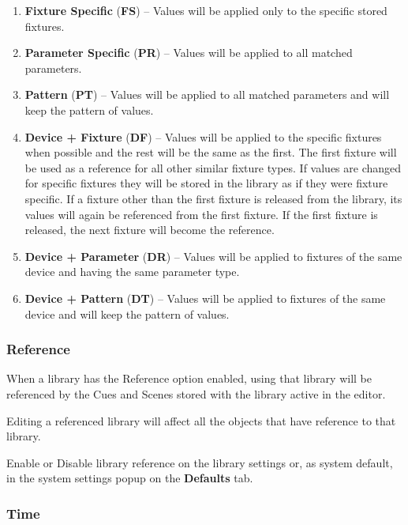 \documentclass[
]{article}
\begin{document}
\begin{enumerate}
\def\labelenumi{\arabic{enumi}.}
\item
  \textbf{Fixture Specific} (\textbf{FS}) -- Values will be applied only to the specific stored fixtures.
\item
  \textbf{Parameter Specific} (\textbf{PR}) -- Values will be applied to all matched parameters.
\item
  \textbf{Pattern} (\textbf{PT}) -- Values will be applied to all matched parameters and will keep the pattern of values.
\item
  \textbf{Device + Fixture} (\textbf{DF}) -- Values will be applied to the specific fixtures when possible and the rest will be the same as the first. The first fixture will be used as a reference for all other similar fixture types. If values are changed for specific fixtures they will be stored in the library as if they were fixture specific. If a fixture other than the first fixture is released from the library, its values will again be referenced from the first fixture. If the first fixture is released, the next fixture will become the reference.
\item
  \textbf{Device + Parameter} (\textbf{DR}) -- Values will be applied to fixtures of the same device and having the same parameter type.
\item
  \textbf{Device + Pattern} (\textbf{DT}) -- Values will be applied to fixtures of the same device and will keep the pattern of values.
\end{enumerate}

\hypertarget{reference}{%
\subsubsection{Reference}\label{reference}}

When a library has the Reference option enabled, using that library will be referenced by the Cues and Scenes stored with the library active in the editor.

Editing a referenced library will affect all the objects that have reference to that library.

Enable or Disable library reference on the library settings or, as system default, in the system settings popup on the \textbf{Defaults} tab.

\hypertarget{time}{%
\subsubsection{Time}\label{time}}
\end{document}
